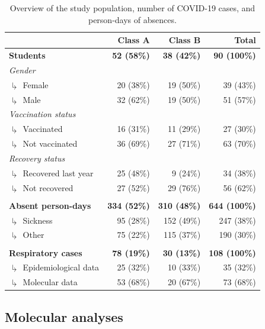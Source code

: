 \documentclass[fleqn,11pt]{wlscirep}
\begin{document}
\begin{table}[!htpb]
    \centering
    \caption{Overview of the study population, number of COVID-19 cases, and person-days of absences.}
    \label{tab:cases-overview-school}
    \footnotesize
    \begin{tabular}{l r r r}
    \toprule
         &  Class A & Class B & Total \\ \midrule 
        \textbf{Students} & \textbf{52 (58\%)} & \textbf{38 (42\%)} & \textbf{90 (100\%)} \\
        \emph{Gender} \\
        $\drsh$ Female & 20 (38\%) & 19 (50\%) & 39 (\hphantom{0}43\%) \\
        $\drsh$ Male & 32 (62\%) & 19 (50\%) & 51 (\hphantom{0}57\%) \\
        \emph{Vaccination status} \\
        $\drsh$ Vaccinated & 16 (31\%) & 11 (29\%) & 27 (\hphantom{0}30\%) \\
        $\drsh$ Not vaccinated & 36 (69\%) & 27 (71\%) & 63 (\hphantom{0}70\%) \\
        \emph{Recovery status} \\
        $\drsh$ Recovered last year & 25 (48\%) & 9 (24\%) & 34 (\hphantom{0}38\%) \\
        $\drsh$ Not recovered & 27 (52\%) & 29 (76\%) & 56 (\hphantom{0}62\%) \\
        & \\
        \textbf{Absent person-days} & \textbf{334 (52\%)} & \textbf{310 (48\%)} & \textbf{644 (100\%)} \\
        $\drsh$ Sickness & 95 (28\%) & 152 (49\%) & 247 (\hphantom{0}38\%) \\
        $\drsh$ Other & 75 (22\%) & 115 (37\%) & 190 (\hphantom{0}30\%) \\
        & \\
        \textbf{Respiratory cases} & \textbf{78 (19\%)} & \textbf{30 (13\%)} &  \textbf{108 (100\%)} \\
        $\drsh$ Epidemiological data & 25 (32\%) & 10 (\hphantom{0}33\%) & 35 (\hphantom{0}32\%) \\
        $\drsh$ Molecular data & 53 (68\%) & 20 (\hphantom{0}67\%) & 73 (\hphantom{0}68\%) \\
        \bottomrule
    \end{tabular} 
\end{table}

\subsection{Molecular analyses}
\end{document}
